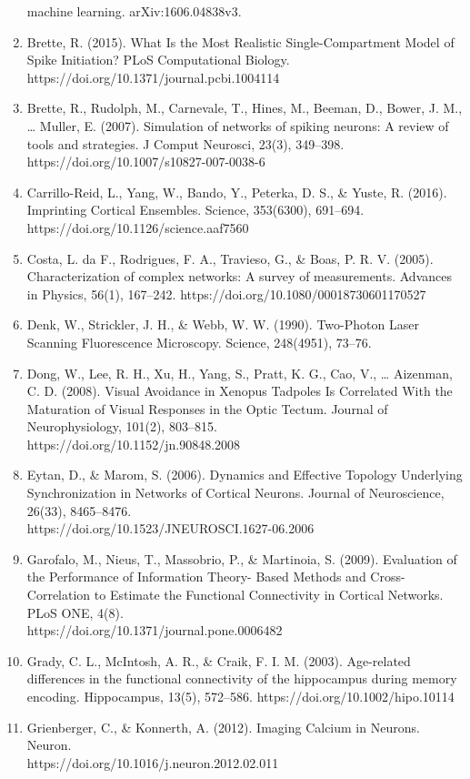 \documentclass[11pt,titlepage]{article}
\begin{document}
\begin{spacing}{1}
\begin{enumerate}
machine learning. arXiv:1606.04838v3.
\item Brette, R. (2015). What Is the Most Realistic Single-Compartment Model of Spike Initiation? PLoS Computational Biology. https://doi.org/10.1371/journal.pcbi.1004114
\item Brette, R., Rudolph, M., Carnevale, T., Hines, M., Beeman, D., Bower, J. M., … Muller, E. (2007). Simulation of networks of spiking neurons: A review of tools and strategies. J Comput Neurosci, 23(3), 349–398. https://doi.org/10.1007/s10827-007-0038-6
\item Carrillo-Reid, L., Yang, W., Bando, Y., Peterka, D. S., \& Yuste, R. (2016). Imprinting Cortical Ensembles. Science, 353(6300), 691–694. https://doi.org/10.1126/science.aaf7560
\item Costa, L. da F., Rodrigues, F. A., Travieso, G., \& Boas, P. R. V. (2005). Characterization of complex networks: A survey of measurements. Advances in Physics, 56(1), 167–242. https://doi.org/10.1080/00018730601170527
\item Denk, W., Strickler, J. H., \& Webb, W. W. (1990). Two-Photon Laser Scanning Fluorescence Microscopy. Science, 248(4951), 73–76.
\item Dong, W., Lee, R. H., Xu, H., Yang, S., Pratt, K. G., Cao, V., … Aizenman, C. D. (2008). Visual Avoidance in Xenopus Tadpoles Is Correlated With the Maturation of Visual Responses in the Optic Tectum. Journal of Neurophysiology, 101(2), 803–815.\\https://doi.org/10.1152/jn.90848.2008
\item Eytan, D., \& Marom, S. (2006). Dynamics and Effective Topology Underlying Synchronization in Networks of Cortical Neurons. Journal of Neuroscience, 26(33), 8465–8476. \\https://doi.org/10.1523/JNEUROSCI.1627-06.2006
\item Garofalo, M., Nieus, T., Massobrio, P., \& Martinoia, S. (2009). Evaluation of the Performance of Information Theory- Based Methods and Cross-Correlation to Estimate the Functional Connectivity in Cortical Networks. PLoS ONE, 4(8).\\https://doi.org/10.1371/journal.pone.0006482
\item Grady, C. L., McIntosh, A. R., \& Craik, F. I. M. (2003). Age-related differences in the functional connectivity of the hippocampus during memory encoding. Hippocampus, 13(5), 572–586. https://doi.org/10.1002/hipo.10114
\item Grienberger, C., \& Konnerth, A. (2012). Imaging Calcium in Neurons. Neuron. \\https://doi.org/10.1016/j.neuron.2012.02.011

\end{enumerate}
\end{spacing}
\end{document}
